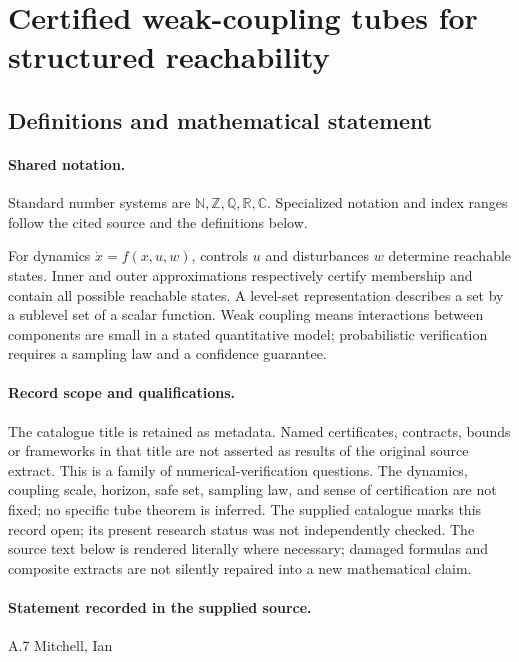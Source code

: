 \documentclass[11pt]{article}
\begin{document}
\section{Certified weak-coupling tubes for structured reachability}\label{statement}

\subsection{Definitions and mathematical statement}

\paragraph{Shared notation.}Standard number systems are $\mathbb N,\mathbb Z,\mathbb Q,\mathbb R,\mathbb C$. Specialized notation and index ranges follow the cited source and the definitions below.


For dynamics $\dot x=f(x,u,w)$, controls $u$ and disturbances $w$ determine reachable states. Inner and outer approximations respectively certify membership and contain all possible reachable states. A level-set representation describes a set by a sublevel set of a scalar function. Weak coupling means interactions between components are small in a stated quantitative model; probabilistic verification requires a sampling law and a confidence guarantee.
\paragraph{Record scope and qualifications.}
The catalogue title is retained as metadata. Named certificates, contracts, bounds or frameworks in that title are not asserted as results of the original source extract.
This is a family of numerical-verification questions. The dynamics, coupling scale, horizon, safe set, sampling law, and sense of certification are not fixed; no specific tube theorem is inferred. The supplied catalogue marks this record open; its present research status was not independently checked.
The source text below is rendered literally where necessary; damaged formulas and composite extracts are not silently repaired into a new mathematical claim.
\paragraph{Statement recorded in the supplied source.}
A.7 Mitchell, Ian
\end{document}
